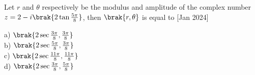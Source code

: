 \item Let $r$ and $\theta$ respectively be the modulus and amplitude of the complex number $z=2-i\brak{2\tan \frac{5\pi}{8}}$, then $\brak{r,\theta}$ is equal to \hfill{[Jan 2024]}
\begin{multicols}{4}
    a) $\brak{2\sec \frac{3\pi}{8}, \frac{3\pi}{8}}$\\
    b) $\brak{2\sec \frac{5\pi}{8}, \frac{3\pi}{8}}$\\
    c) $\brak{2\sec \frac{11\pi}{8}, \frac{11\pi}{8}}$\\
    d) $\brak{2\sec \frac{3\pi}{8}, \frac{5\pi}{8}}$
\end{multicols}

